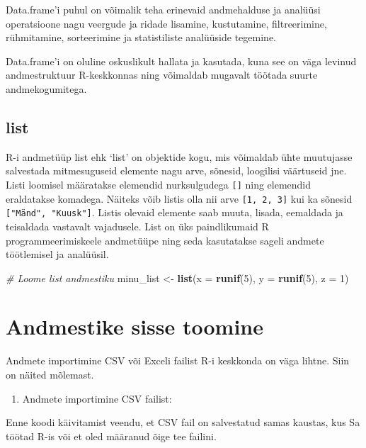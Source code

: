 \documentclass[
]{book}
\newenvironment{Shaded}{\begin{snugshade}}{\end{snugshade}}
\newcommand{\AttributeTok}[1]{\textcolor[rgb]{0.13,0.29,0.53}{#1}}
\newcommand{\CommentTok}[1]{\textcolor[rgb]{0.56,0.35,0.01}{\textit{#1}}}
\newcommand{\DecValTok}[1]{\textcolor[rgb]{0.00,0.00,0.81}{#1}}
\newcommand{\FunctionTok}[1]{\textcolor[rgb]{0.13,0.29,0.53}{\textbf{#1}}}
\newcommand{\NormalTok}[1]{#1}
\newcommand{\OtherTok}[1]{\textcolor[rgb]{0.56,0.35,0.01}{#1}}
\providecommand{\tightlist}{%
  \setlength{\itemsep}{0pt}\setlength{\parskip}{0pt}}
\renewenvironment{Shaded} {\begin{snugshade}\footnotesize} {\end{snugshade}}
\begin{document}
Data.frame'i puhul on võimalik teha erinevaid andmehalduse ja analüüsi operatsioone nagu veergude ja ridade lisamine, kustutamine, filtreerimine, rühmitamine, sorteerimine ja statistiliste analüüside tegemine.

Data.frame'i on oluline oskuslikult hallata ja kasutada, kuna see on väga levinud andmestruktuur R-keskkonnas ning võimaldab mugavalt töötada suurte andmekogumitega.

\subsection{list}\label{list}

R-i andmetüüp list ehk `list' on objektide kogu, mis võimaldab ühte muutujasse salvestada mitmesuguseid elemente nagu arve, sõnesid, loogilisi väärtuseid jne. Listi loomisel määratakse elemendid nurksulgudega \texttt{{[}{]}} ning elemendid eraldatakse komadega. Näiteks võib listis olla nii arve \texttt{{[}1,\ 2,\ 3{]}} kui ka sõnesid \texttt{{[}"Mänd",\ "Kuusk"{]}}. Listis olevaid elemente saab muuta, lisada, eemaldada ja teisaldada vastavalt vajadusele. List on üks paindlikumaid R programmeerimiskeele andmetüüpe ning seda kasutatakse sageli andmete töötlemisel ja analüüsil.

\begin{Shaded}
\begin{Highlighting}[]
\CommentTok{\# Loome list andmestiku}
\NormalTok{minu\_list }\OtherTok{\textless{}{-}} \FunctionTok{list}\NormalTok{(}\AttributeTok{x =} \FunctionTok{runif}\NormalTok{(}\DecValTok{5}\NormalTok{), }\AttributeTok{y =} \FunctionTok{runif}\NormalTok{(}\DecValTok{5}\NormalTok{), }\AttributeTok{z =} \DecValTok{1}\NormalTok{)}
\end{Highlighting}
\end{Shaded}

\section{Andmestike sisse toomine}\label{andmestike-sisse-toomine}

Andmete importimine CSV või Exceli failist R-i keskkonda on väga lihtne. Siin on näited mõlemast.

\begin{enumerate}
\def\labelenumi{\arabic{enumi}.}
\tightlist
\item
  Andmete importimine CSV failist:
\end{enumerate}

Enne koodi käivitamist veendu, et CSV fail on salvestatud samas kaustas, kus Sa töötad R-is või et oled määranud õige tee failini.
\end{document}
